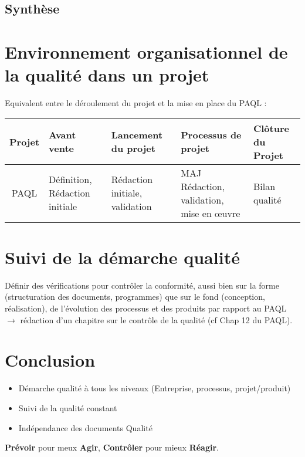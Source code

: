 	\subsection{Synthèse}
	
\section{Environnement organisationnel de la qualité dans un projet}


Equivalent entre le déroulement du projet et la mise en place du PAQL :\\

\begin{tabular}{|c|p{3cm}|p{3cm}|p{3cm}|p{3cm}|}
\hline
Projet & Avant vente & Lancement du projet & Processus de projet & Clôture du Projet\\
\hline
PAQL & Définition, Rédaction initiale & Rédaction initiale, validation & MAJ Rédaction, validation, mise en \oe{}uvre & Bilan qualité\\
\hline
\end{tabular}

\section{Suivi de la démarche qualité}

Définir des vérifications pour contrôler la conformité, aussi bien sur la forme (structuration des documents, programmes) que sur le fond (conception, réalisation), de l’évolution des processus et des produits par rapport au PAQL $\rightarrow$ rédaction d’un chapitre sur le contrôle de la qualité (cf Chap 12 du PAQL).

\section{Conclusion}

\begin{itemize}
\item Démarche qualité à tous les niveaux (Entreprise, processus, projet/produit)
\item Suivi de la qualité constant
\item Indépendance des documents Qualité
\end{itemize}

\textbf{Prévoir} pour meux \textbf{Agir}, \textbf{Contrôler} pour mieux \textbf{Réagir}.\\

